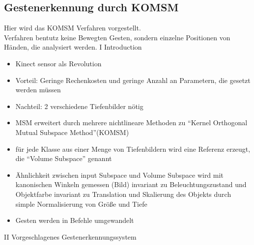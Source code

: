 \documentclass{llncs}
\begin{document}
\subsection{Gestenerkennung durch KOMSM}
Hier wird das KOMSM Verfahren vorgestellt.\\
Verfahren bentutz keine Bewegten Gesten, sondern einzelne Positionen von Händen, die analysiert werden. 
I Introduction
\begin{itemize}
\item Kinect sensor als Revolution
\item Vorteil: Geringe Rechenkosten und geringe Anzahl an Parametern, die gesetzt werden müssen
\item Nachteil: 2 verschiedene Tiefenbilder n\"otig
\item MSM erweitert durch mehrere nichtlineare Methoden zu ``Kernel Orthogonal Mutual Subspace Method''(KOMSM)
\item für jede Klasse aus einer Menge von Tiefenbildern wird eine Referenz erzeugt, die ``Volume Subspace'' genannt
\item Ähnlichkeit zwischen input Subspace und Volume Subspace wird mit kanonischen Winkeln gemessen (Bild)
\subitem invariant zu Beleuchtungszustand und Objektfarbe
\subitem invariant zu Translation und Skalierung des Objekts durch simple Normalisierung von Gr\"oße und Tiefe
\item Gesten werden in Befehle umgewandelt
\end{itemize}
II Vorgeschlagenes Gestenerkennungssystem
\end{document}
